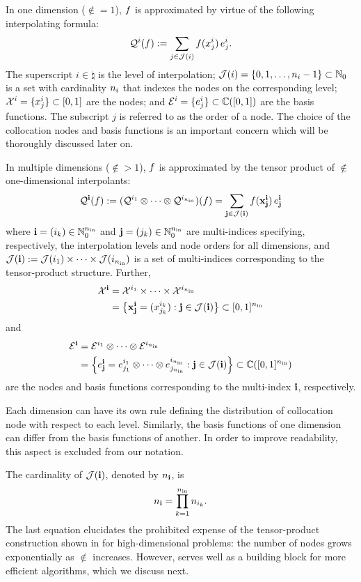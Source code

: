 In one dimension ($\nin = 1$), $f$ is approximated by virtue of the following
interpolating formula:
\begin{equation} \elab{tensor-1d}
  \tensor{i}(\f) := \sum_{j \in \index(i)} \f(\x^i_j) \, \e^i_j.
\end{equation}
The superscript $i \in \natural$ is the level of interpolation; $\mathcal{J}(i) = \{
0, 1, \dots, n_i - 1 \} \subset \mathbb{N}_0$ is a set with cardinality $n_i$ that
indexes the nodes on the corresponding level; $\mathcal{X}^i = \{ x^i_j \} \subset [0,
1]$ are the nodes; and $\mathcal{E}^i = \{ e^i_j \} \subset \mathbb{C}([0, 1])$ are the
basis functions. The subscript $j$ is referred to as the order of a node. The
choice of the collocation nodes and basis functions is an important concern
which will be thoroughly discussed later on.

In multiple dimensions ($\nin > 1$), $f$ is approximated by the tensor product
of $\nin$ one-dimensional interpolants:
\begin{equation} \elab{tensor}
  \tensor{\vi}(\f) := (\tensor{i_1} \otimes \cdots \otimes \tensor{i_\nin})(\f) = \sum_{\vj \in \index(\vi)} \f(\vx^\vi_\vj) \, \e^\vi_\vj
\end{equation}
where $\mathbf{i} = (i_k) \in \mathbb{N}_0^{n_\text{in}}$ and $\mathbf{j} = (j_k) \in \mathbb{N}_0^{n_\text{in}}$ are
multi-indices specifying, respectively, the interpolation levels and node orders
for all dimensions, and $\mathcal{J}(\mathbf{i}) := \mathcal{J}(i_1) \times \cdots \times
\mathcal{J}(i_{n_\text{in}})$ is a set of multi-indices corresponding to the tensor-product
structure. Further,
\begin{align}
  \X^\vi &= \X^{i_1} \times \cdots \times \X^{i_\nin} \elab{collocation-nodes} \\
         &= \left\{ \vx^\vi_\vj = (\x^{i_k}_{j_k}): \vj \in \index(\vi) \right\} \subset [0, 1]^\nin \nonumber
\end{align}
and
\begin{align}
  \E^\vi &= \E^{i_1} \otimes \cdots \otimes \E^{i_\nin} \elab{basis-functions} \\
         &= \left\{ \e^\vi_\vj = \e^{i_1}_{j_1} \otimes \cdots \otimes \e^{i_\nin}_{j_\nin}: \vj \in \index(\vi) \right\} \subset \continuous([0, 1]^\nin) \nonumber
\end{align}
are the nodes and basis functions corresponding to the multi-index $\mathbf{i}$,
respectively.
\begin{remark}
Each dimension can have its own rule defining the distribution of collocation
node with respect to each level. Similarly, the basis functions of one dimension
can differ from the basis functions of another. In order to improve readability,
this aspect is excluded from our notation.
\end{remark}
The cardinality of $\mathcal{J}(\mathbf{i})$, denoted by $n_{\mathbf{i}}$, is
\begin{equation} \elab{tensor-cardinality}
  \n_\vi = \prod_{k = 1}^\nin \n_{i_k}.
\end{equation}
The last equation elucidates the prohibited expense of the tensor-product
construction shown in  for high-dimensional problems: the number of
nodes grows exponentially as $\nin$ increases. However,  serves
well as a building block for more efficient algorithms, which we discuss next.
